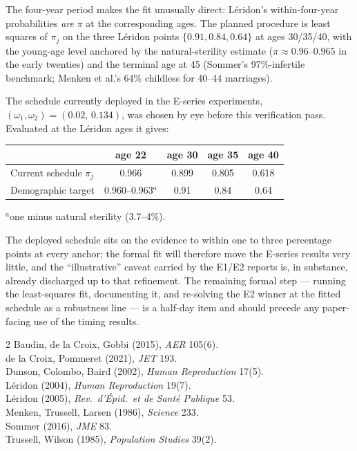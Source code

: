 \documentclass[11pt]{article}
\begin{document}
The four-year period makes the fit unusually direct: L\'eridon's
within-four-year probabilities \emph{are} $\pi$ at the corresponding ages.
The planned procedure is least squares of $\pi_j$ on the three L\'eridon
points $\{0.91,0.84,0.64\}$ at ages 30/35/40, with the young-age level
anchored by the natural-sterility estimate ($\pi \approx 0.96$--$0.965$ in
the early twenties) and the terminal age at 45 (Sommer's 97\%-infertile
benchmark; Menken et al.'s 64\% childless for 40--44 marriages).

The schedule currently deployed in the E-series experiments,
$(\omega_1,\omega_2)=(0.02,\,0.134)$, was chosen by eye before this
verification pass. Evaluated at the L\'eridon ages it gives:

\begin{center}\small
\begin{tabular}{lcccc}
\toprule
 & age 22 & age 30 & age 35 & age 40 \\
\midrule
Current schedule $\pi_j$ & 0.966 & 0.899 & 0.805 & 0.618 \\
Demographic target & 0.960--0.963$^{a}$ & 0.91 & 0.84 & 0.64 \\
\bottomrule
\end{tabular}

{\footnotesize $^{a}$one minus natural sterility (3.7--4\%).}
\end{center}

The deployed schedule sits on the evidence to within one to three
percentage points at every anchor; the formal fit will therefore move the
E-series results very little, and the ``illustrative'' caveat carried by
the E1/E2 reports is, in substance, already discharged up to that
refinement. The remaining formal step --- running the least-squares fit,
documenting it, and re-solving the E2 winner at the fitted schedule as a
robustness line --- is a half-day item and should precede any paper-facing
use of the timing results.

\begin{footnotesize}
\begin{multicols}{2}
\noindent Baudin, de la Croix, Gobbi (2015), \emph{AER} 105(6).\\
de la Croix, Pommeret (2021), \emph{JET} 193.\\
Dunson, Colombo, Baird (2002), \emph{Human Reproduction} 17(5).\\
L\'eridon (2004), \emph{Human Reproduction} 19(7).\\
L\'eridon (2005), \emph{Rev.\ d'\'Epid.\ et de Sant\'e Publique} 53.\\
Menken, Trussell, Larsen (1986), \emph{Science} 233.\\
Sommer (2016), \emph{JME} 83.\\
Trussell, Wilson (1985), \emph{Population Studies} 39(2).
\end{multicols}
\end{footnotesize}
\end{document}
